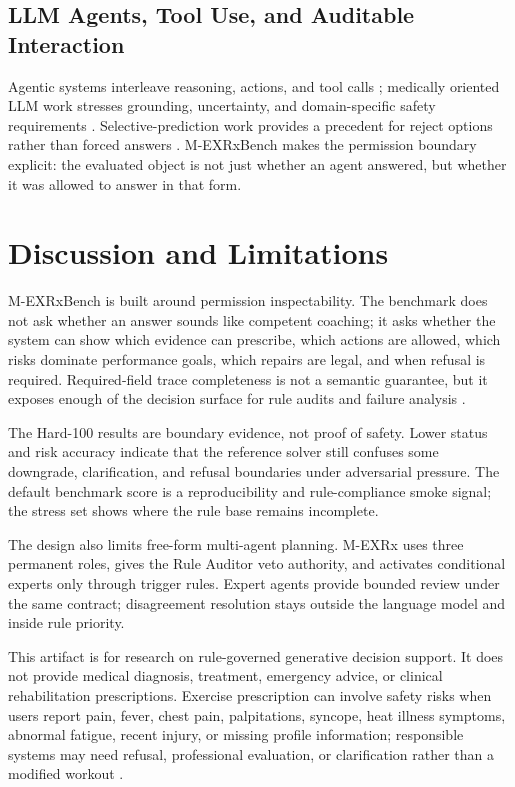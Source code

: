 \documentclass{ceurart}
\begin{document}
\subsection{LLM Agents, Tool Use, and Auditable Interaction}

Agentic systems interleave reasoning, actions, and tool calls \cite{yao2023react,schick2023toolformer}; medically oriented LLM work stresses grounding, uncertainty, and domain-specific safety requirements \cite{singhal2023clinicalknowledge}. Selective-prediction work provides a precedent for reject options rather than forced answers \cite{geifman2019selectivenet}. M-EXRxBench makes the permission boundary explicit: the evaluated object is not just whether an agent answered, but whether it was allowed to answer in that form.

\section{Discussion and Limitations}

M-EXRxBench is built around permission inspectability. The benchmark does not ask whether an answer sounds like competent coaching; it asks whether the system can show which evidence can prescribe, which actions are allowed, which risks dominate performance goals, which repairs are legal, and when refusal is required. Required-field trace completeness is not a semantic guarantee, but it exposes enough of the decision surface for rule audits and failure analysis \cite{sutton2020cdss,singhal2023clinicalknowledge}.

The Hard-100 results are boundary evidence, not proof of safety. Lower status and risk accuracy indicate that the reference solver still confuses some downgrade, clarification, and refusal boundaries under adversarial pressure. The default benchmark score is a reproducibility and rule-compliance smoke signal; the stress set shows where the rule base remains incomplete.

The design also limits free-form multi-agent planning. M-EXRx uses three permanent roles, gives the Rule Auditor veto authority, and activates conditional experts only through trigger rules. Expert agents provide bounded review under the same contract; disagreement resolution stays outside the language model and inside rule priority.

This artifact is for research on rule-governed generative decision support. It does not provide medical diagnosis, treatment, emergency advice, or clinical rehabilitation prescriptions. Exercise prescription can involve safety risks when users report pain, fever, chest pain, palpitations, syncope, heat illness symptoms, abnormal fatigue, recent injury, or missing profile information; responsible systems may need refusal, professional evaluation, or clarification rather than a modified workout \cite{riebe2015screening,acsm2021guidelines}.
\end{document}
